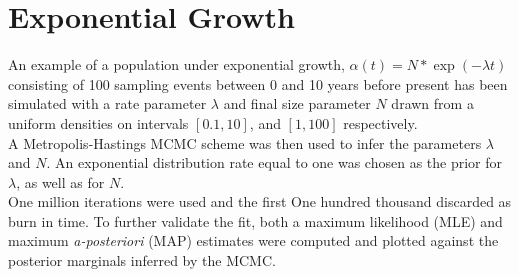 \documentclass{ieeeaccess}
\theoremstyle{definition}
\begin{document}
\section{Exponential Growth}
An example of a population under exponential growth, $\alpha(t) = N*\exp(-\lambda t)$ consisting of 100 sampling events between 0 and 10 years before present has been simulated with a rate parameter $\lambda$ and final size parameter $N$ drawn from a uniform densities on intervals $[0.1, 10]$, and $[1,100]$ respectively.\\
A Metropolis-Hastings MCMC scheme was then used to infer the parameters $\lambda$ and $N$. An exponential distribution rate equal to one was chosen as the prior for $\lambda$, as well as for $N$.\\
One million iterations were used and the first One hundred thousand discarded as burn in time. To further validate the fit, both a maximum likelihood (MLE) and maximum \textit{a-posteriori} (MAP) estimates were computed and plotted against the posterior marginals inferred by the MCMC.
\end{document}
